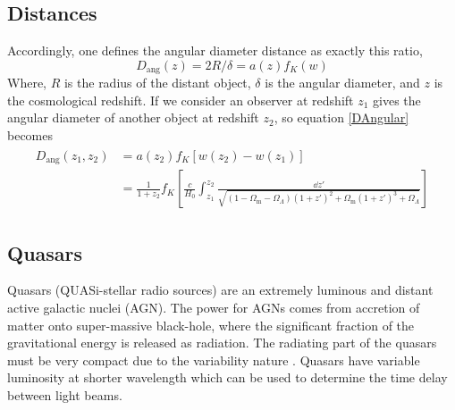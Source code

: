  \subsection{Distances}
  Accordingly, one defines the angular diameter distance as exactly this ratio,
  \begin{equation}
  	D_\text{ang}(z)=2R/\delta=a(z)f_{K}(w)
  \label{DAngular}
  \end{equation}
  \noindent
  Where, $R$ is the radius of the distant object, $\delta$ is the angular diameter, and $z$ is the cosmological redshift. If we consider an observer at redshift $ z_{1} $ gives the angular diameter of another object at redshift $ z_{2} $, so equation \ref{DAngular} becomes~\cite{manual}
  \begin{align}
	  \begin{split}
	  D_\text{ang}(z_{1},z_{2}) &=a(z_{2})f_{K}[w(z_{2}) - w(z_{1})] \\
										 &= \frac{1}{1+z_2} f_{K} \left[ \frac{c}{H_0} \int_{z_1}^{z_2} \frac{\dd{z'}}{\sqrt{(1-\Omega_\text{m}-\Omega_\Lambda)(1+z')^2 + \Omega_\text{m}(1+z')^3+\Omega_\Lambda}} \right]					
	  \end{split}
  \label{math:Dangular2}
  \end{align}

\subsection{Quasars}
Quasars (QUASi-stellar radio sources) are an extremely luminous and distant active galactic nuclei (AGN). The power for AGNs comes from accretion of matter onto super-massive black-hole, where the significant fraction of the gravitational energy is released as radiation. The radiating part of the quasars must be very compact due to the variability nature
\cite{manual}. Quasars have variable luminosity at shorter wavelength which can be used to determine the time delay between light beams.

